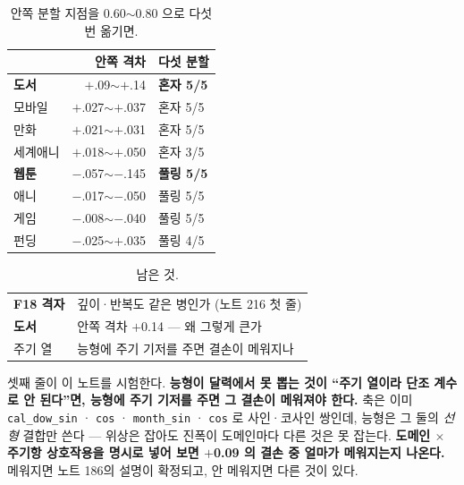 \documentclass[10pt]{article}
\begin{document}
\begin{table}[t]
\centering\tsize
\caption{안쪽 분할 지점을 0.60$\sim$0.80 으로 다섯 번 옮기면.}
\begin{tabular}{lrl}
\toprule
& 안쪽 격차 & 다섯 분할 \\
\midrule
\textbf{도서} & $+$.09$\sim$$+$.14 & \textbf{혼자 5/5} \\
모바일 & $+$.027$\sim$$+$.037 & 혼자 5/5 \\
만화 & $+$.021$\sim$$+$.031 & 혼자 5/5 \\
세계애니 & $+$.018$\sim$$+$.050 & 혼자 3/5 \\
\midrule
\textbf{웹툰} & $-$.057$\sim$$-$.145 & \textbf{풀링 5/5} \\
애니 & $-$.017$\sim$$-$.050 & 풀링 5/5 \\
게임 & $-$.008$\sim$$-$.040 & 풀링 5/5 \\
펀딩 & $-$.025$\sim$$+$.035 & 풀링 4/5 \\
\bottomrule
\end{tabular}
\end{table}



\begin{table}[t]
\centering\tsize
\caption{남은 것.}
\begin{tabular}{ll}
\toprule
\textbf{F18 격자} & 깊이·반복도 같은 병인가 (노트 216 첫 줄) \\
\textbf{도서} & 안쪽 격차 $+$0.14 --- 왜 그렇게 큰가 \\
주기 열 & 능형에 주기 기저를 주면 결손이 메워지나 \\
\bottomrule
\end{tabular}
\end{table}

셋째 줄이 이 노트를 시험한다. \textbf{능형이 달력에서 못 뽑는 것이
``주기 열이라 단조 계수로 안 된다''면, 능형에 주기 기저를 주면 그 결손이
메워져야 한다.} 축은 이미 \texttt{cal\_dow\_sin} · \texttt{cos} ·
\texttt{month\_sin} · \texttt{cos} 로 사인·코사인 쌍인데, 능형은 그 둘의
\emph{선형} 결합만 쓴다 --- 위상은 잡아도 진폭이 도메인마다 다른 것은
못 잡는다. \textbf{도메인 $\times$ 주기항 상호작용을 명시로 넣어 보면
$+$0.09 의 결손 중 얼마가 메워지는지 나온다.} 메워지면 노트 186의 설명이
확정되고, 안 메워지면 다른 것이 있다.
\end{document}
